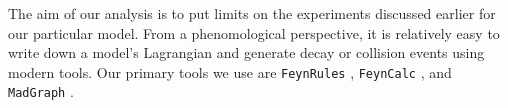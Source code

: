 \label{chapter:analysis}

The aim of our analysis is to put limits on the experiments discussed earlier for our particular model.
From a phenomological perspective, it is relatively easy to write down a model's Lagrangian and generate decay or collision events using modern tools.
Our primary tools we use are \texttt{FeynRules} \cite{Alloul:2013bka}, \texttt{FeynCalc} \cite{Mertig:1990an}, and \texttt{MadGraph} \cite{Alwall:2014hca}.
